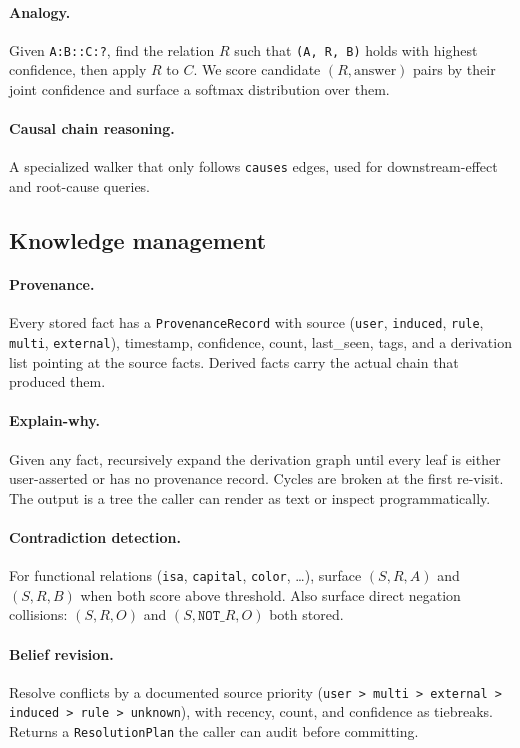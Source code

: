 \documentclass[11pt]{article}
\begin{document}
\paragraph{Analogy.} Given \texttt{A:B::C:?}, find the relation
$R$ such that \texttt{(A, R, B)} holds with highest confidence,
then apply $R$ to $C$. We score candidate $(R, \text{answer})$ pairs
by their joint confidence and surface a softmax distribution over
them.

\paragraph{Causal chain reasoning.} A specialized walker that only
follows \texttt{causes} edges, used for downstream-effect and
root-cause queries.

\subsection{Knowledge management}

\paragraph{Provenance.} Every stored fact has a \texttt{ProvenanceRecord}
with source (\texttt{user}, \texttt{induced}, \texttt{rule},
\texttt{multi}, \texttt{external}), timestamp, confidence, count,
last\_seen, tags, and a derivation list pointing at the source facts.
Derived facts carry the actual chain that produced them.

\paragraph{Explain-why.} Given any fact, recursively expand the
derivation graph until every leaf is either user-asserted or has no
provenance record. Cycles are broken at the first re-visit. The
output is a tree the caller can render as text or inspect
programmatically.

\paragraph{Contradiction detection.} For functional relations
(\texttt{isa}, \texttt{capital}, \texttt{color}, \ldots), surface
$(S, R, A)$ and $(S, R, B)$ when both score above threshold. Also
surface direct negation collisions: $(S, R, O)$ and $(S, \texttt{NOT}\_R, O)$
both stored.

\paragraph{Belief revision.} Resolve conflicts by a documented source
priority (\texttt{user > multi > external > induced > rule > unknown}),
with recency, count, and confidence as tiebreaks. Returns a
\texttt{ResolutionPlan} the caller can audit before committing.
\end{document}
